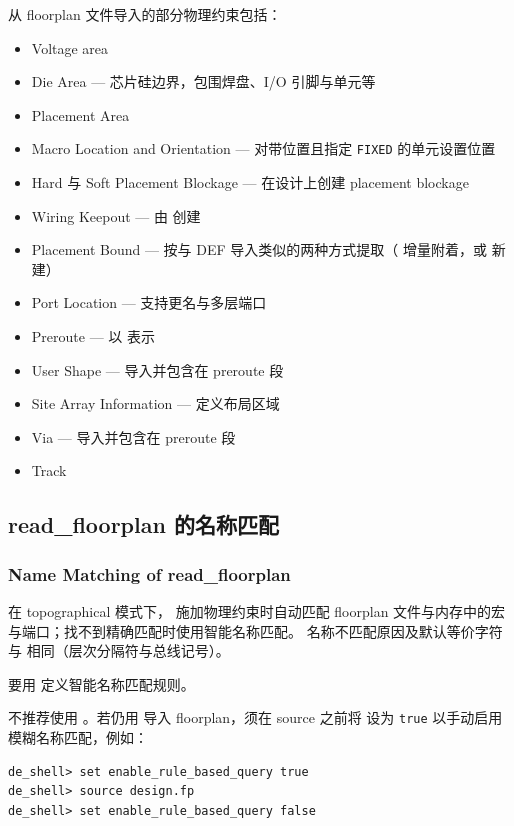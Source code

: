 从 floorplan 文件导入的部分物理约束包括：
\begin{itemize}
  \item Voltage area
  \item Die Area — 芯片硅边界，包围焊盘、I/O 引脚与单元等
  \item Placement Area
  \item Macro Location and Orientation — 对带位置且指定 \texttt{FIXED} 的单元设置位置
  \item Hard 与 Soft Placement Blockage — 在设计上创建 placement blockage
  \item Wiring Keepout — 由  创建
  \item Placement Bound — 按与 DEF 导入类似的两种方式提取（ 增量附着，或  新建）
  \item Port Location — 支持更名与多层端口
  \item Preroute — 以  表示
  \item User Shape — 导入并包含在 preroute 段
  \item Site Array Information — 定义布局区域
  \item Via — 导入并包含在 preroute 段
  \item Track
\end{itemize}

\subsection{read\_floorplan 的名称匹配}
\subsubsection*{Name Matching of read\_floorplan}

在 topographical 模式下， 施加物理约束时自动匹配 floorplan 文件与内存中的宏与端口；找不到精确匹配时使用智能名称匹配。
名称不匹配原因及默认等价字符与  相同（层次分隔符与总线记号）。

要用  定义智能名称匹配规则。

\begin{noteBox}
不推荐使用 。若仍用  导入 floorplan，须在 source 之前将  设为 \texttt{true} 以手动启用模糊名称匹配，例如：
\begin{lstlisting}
de_shell> set enable_rule_based_query true
de_shell> source design.fp
de_shell> set enable_rule_based_query false
\end{lstlisting}
\end{noteBox}

